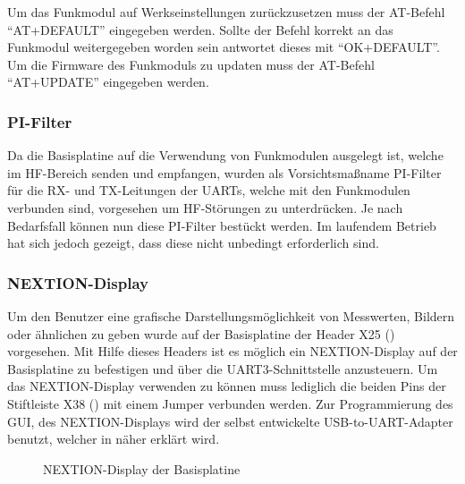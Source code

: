 Um das Funkmodul auf Werkseinstellungen zurückzusetzen muss der AT-Befehl \enquote{AT+DEFAULT} eingegeben werden. Sollte der Befehl korrekt an das Funkmodul weitergegeben worden sein antwortet dieses mit \enquote{OK+DEFAULT}. Um die Firmware des Funkmoduls zu updaten muss der AT-Befehl \enquote{AT+UPDATE} eingegeben werden.

\subsubsection{PI-Filter}
Da die \gls{Basisplatine} auf die Verwendung von Funkmodulen ausgelegt ist, welche im HF-Bereich senden und empfangen, wurden als Vorsichtsmaßname PI-Filter für die RX- und TX-Leitungen der UARTs, welche mit den Funkmodulen verbunden sind, vorgesehen um HF-Störungen zu unterdrücken. Je nach Bedarfsfall können nun diese PI-Filter bestückt werden. Im laufendem Betrieb hat sich jedoch gezeigt, dass diese nicht unbedingt erforderlich sind.


\subsubsection{NEXTION-Display}
Um den Benutzer eine grafische Darstellungsmöglichkeit von Messwerten, Bildern oder ähnlichen zu geben wurde auf der Basisplatine der Header X25 () vorgesehen. Mit Hilfe dieses Headers ist es möglich ein NEXTION-Display auf der Basisplatine zu befestigen und über die UART3-Schnittstelle anzusteuern. Um das NEXTION-Display verwenden zu können muss lediglich die beiden Pins der Stiftleiste X38 () mit einem Jumper verbunden werden. Zur Programmierung des \gls{GUI}, des NEXTION-Displays wird der selbst entwickelte \gls{USB-to-UART}-Adapter benutzt, welcher in  näher erklärt wird.

\begin{figure}[H]
    \centering
    \qquad
    \qquad
    \caption[NEXTION-Display der Basisplatine]{NEXTION-Display der \gls{Basisplatine}}
    \label{fig:basisplatine-nextion}
\end{figure}

